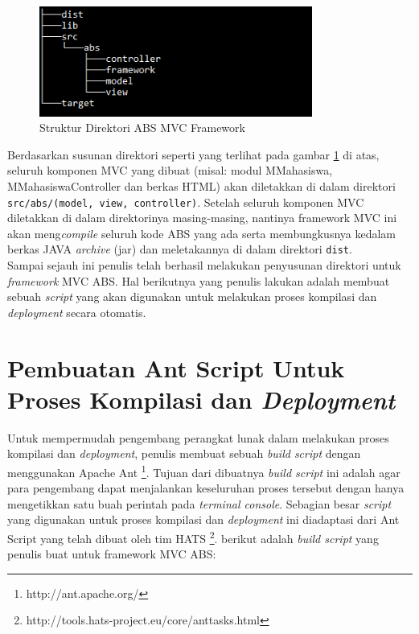 \begin{figure}
    \centering
    \includegraphics[width=0.8\textwidth]
        {img/struktur-direktori.png}
    \caption{Struktur Direktori ABS MVC Framework}
    \label{fig:strukturDirektori}
\end{figure}

Berdasarkan susunan direktori seperti yang terlihat pada gambar \ref{fig:strukturDirektori} di atas, seluruh komponen MVC yang dibuat (misal: modul MMahasiswa, MMahasiswaController dan berkas HTML) akan diletakkan di dalam direktori \texttt{src/abs/(model, view, controller)}. Setelah seluruh komponen MVC diletakkan di dalam direktorinya masing-masing, nantinya framework MVC ini akan meng\textit{compile} seluruh kode ABS yang ada serta membungkusnya kedalam berkas JAVA \textit{archive} (jar) dan meletakannya di dalam direktori \texttt{dist}.\\

Sampai sejauh ini penulis telah berhasil melakukan penyusunan direktori untuk \textit{framework} MVC ABS. Hal berikutnya yang penulis lakukan adalah membuat sebuah \textit{script} yang akan digunakan untuk melakukan proses kompilasi dan \textit{deployment} secara otomatis.

\section{Pembuatan Ant Script Untuk Proses Kompilasi dan \textit{Deployment}}

Untuk mempermudah pengembang perangkat lunak dalam melakukan proses kompilasi dan \textit{deployment}, penulis membuat sebuah \textit{build script} dengan menggunakan Apache Ant \footnote{http://ant.apache.org/}. Tujuan dari dibuatnya \textit{build script} ini adalah agar para pengembang dapat menjalankan keseluruhan proses tersebut dengan hanya mengetikkan satu buah perintah pada \textit{terminal console}. Sebagian besar \textit{script} yang digunakan untuk proses kompilasi dan \textit{deployment} ini diadaptasi dari Ant Script yang telah dibuat oleh tim HATS \footnote{http://tools.hats-project.eu/core/anttasks.html}. berikut adalah \textit{build script} yang penulis buat untuk framework MVC ABS:

